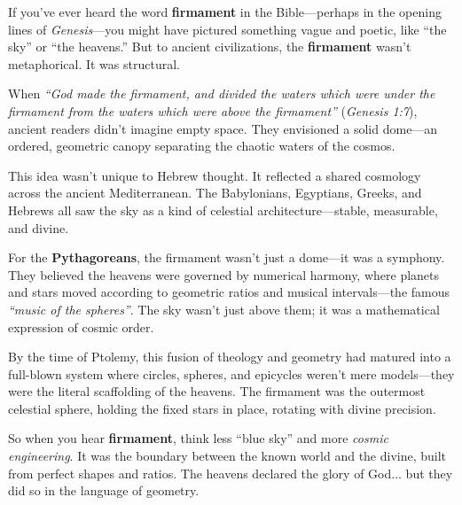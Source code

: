 \begin{tcolorbox}[colback=blue!5!white, colframe=blue!50!black, title={Historical Sidebar: The Firmament—Where Theology Meets Geometry}]

    If you’ve ever heard the word \textbf{firmament} in the Bible—perhaps in the opening lines of \textit{Genesis}—you might have pictured something vague and poetic, like ``the sky'' or ``the heavens.'' But to ancient civilizations, the \textbf{firmament} wasn’t metaphorical. It was structural.

    \medskip
    
    When \textit{``God made the firmament, and divided the waters which were under the firmament from the waters which were above the firmament''} (\textit{Genesis 1:7}), ancient readers didn’t imagine empty space. They envisioned a solid dome—an ordered, geometric canopy separating the chaotic waters of the cosmos. 

    \medskip
    
    This idea wasn’t unique to Hebrew thought. It reflected a shared cosmology across the ancient Mediterranean. The Babylonians, Egyptians, Greeks, and Hebrews all saw the sky as a kind of celestial architecture—stable, measurable, and divine.

    \medskip
    
    For the \textbf{Pythagoreans}, the firmament wasn’t just a dome—it was a symphony. They believed the heavens were governed by numerical harmony, where planets and stars moved according to geometric ratios and musical intervals—the famous \textit{“music of the spheres”}. The sky wasn’t just above them; it was a mathematical expression of cosmic order.
    
    \medskip

    By the time of Ptolemy, this fusion of theology and geometry had matured into a full-blown system where circles, spheres, and epicycles weren’t mere models—they were the literal scaffolding of the heavens. The firmament was the outermost celestial sphere, holding the fixed stars in place, rotating with divine precision.
    
    \medskip

    So when you hear \textbf{firmament}, think less ``blue sky'' and more \textit{cosmic engineering}. It was the boundary between the known world and the divine, built from perfect shapes and ratios. The heavens declared the glory of God... but they did so in the language of geometry.
    
\end{tcolorbox}

